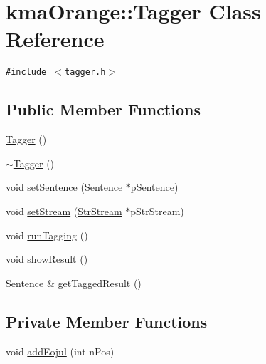 \hypertarget{classkmaOrange_1_1Tagger}{
\section{kmaOrange::Tagger Class Reference}
\label{classkmaOrange_1_1Tagger}
}
{\tt \#include $<$tagger.h$>$}

\subsection*{Public Member Functions}
\begin{CompactItemize}
\item 
\hyperlink{classkmaOrange_1_1Tagger_85edb4126121261305a7b33c186e0358}{Tagger} ()
\item 
\hyperlink{classkmaOrange_1_1Tagger_10916f1ba03a7906d43e9cfe6fbd096c}{$\sim$Tagger} ()
\item 
void \hyperlink{classkmaOrange_1_1Tagger_4799c62076d6ca9c986c678cdadc4198}{setSentence} (\hyperlink{classSentence}{Sentence} $\ast$pSentence)
\item 
void \hyperlink{classkmaOrange_1_1Tagger_ce367128987513755a3581ed5ef3dfd4}{setStream} (\hyperlink{classkmaOrange_1_1StrStream}{StrStream} $\ast$pStrStream)
\item 
void \hyperlink{classkmaOrange_1_1Tagger_a53c0e5e1bcd78600467b5010ced45a6}{runTagging} ()
\item 
void \hyperlink{classkmaOrange_1_1Tagger_774d2a378a7f3e7b649d261207e633cb}{showResult} ()
\item 
\hyperlink{classSentence}{Sentence} \& \hyperlink{classkmaOrange_1_1Tagger_0385be36b614605b2d3715cd27bd4434}{getTaggedResult} ()
\end{CompactItemize}
\subsection*{Private Member Functions}
\begin{CompactItemize}
\item 
void \hyperlink{classkmaOrange_1_1Tagger_88236fa94bd05f73385482d9d2f327ab}{addEojul} (int nPos)
\end{CompactItemize}
